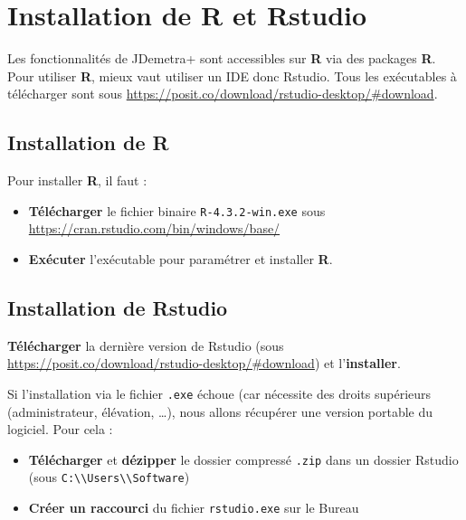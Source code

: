 \documentclass[
]{article}
\providecommand{\tightlist}{%
  \setlength{\itemsep}{0pt}\setlength{\parskip}{0pt}}
\begin{document}
\hypertarget{installation-de-r-et-rstudio}{%
\section{\texorpdfstring{Installation de \textbf{R} et
Rstudio}{Installation de R et Rstudio}}\label{installation-de-r-et-rstudio}}

Les fonctionnalités de JDemetra+ sont accessibles sur \textbf{R} via des
packages \textbf{R}. Pour utiliser \textbf{R}, mieux vaut utiliser un
IDE donc Rstudio. Tous les exécutables à télécharger sont sous
\textcolor{html_color}{\url{https://posit.co/download/rstudio-desktop/\#download}}.

\hypertarget{installation-de-r}{%
\subsection{\texorpdfstring{Installation de
\textbf{R}}{Installation de R}}\label{installation-de-r}}

Pour installer \textbf{R}, il faut :

\begin{itemize}
\tightlist
\item
  \textbf{Télécharger} le fichier binaire \texttt{R-4.3.2-win.exe} sous
  \textcolor{html_color}{\url{https://cran.rstudio.com/bin/windows/base/}}
\item
  \textbf{Exécuter} l'exécutable pour paramétrer et installer
  \textbf{R}.
\end{itemize}

\hypertarget{installation-de-rstudio}{%
\subsection{Installation de Rstudio}\label{installation-de-rstudio}}

\textbf{Télécharger} la dernière version de Rstudio (sous
\textcolor{html_color}{\url{https://posit.co/download/rstudio-desktop/\#download}})
et l'\textbf{installer}.

Si l'installation via le fichier \texttt{.exe} échoue (car nécessite des
droits supérieurs (administrateur, élévation, \ldots), nous allons
récupérer une version portable du logiciel. Pour cela :

\begin{itemize}
\tightlist
\item
  \textbf{Télécharger} et \textbf{dézipper} le dossier compressé
  \texttt{.zip} dans un dossier Rstudio (sous
  \textcolor{windows_path_color}{\nolinkurl{C:\\Users\\Software}})
\item
  \textbf{Créer un raccourci} du fichier \texttt{rstudio.exe} sur le
  Bureau
\end{itemize}
\end{document}
